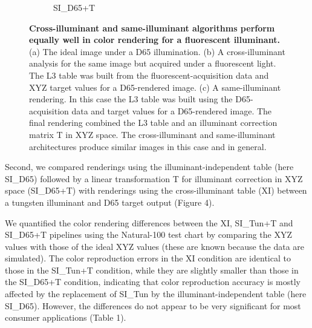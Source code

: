 \documentclass[]{spie}
\begin{document}
\begin{figure}
\begin{center}
\begin{subfigure}[b]{0.3\textwidth}
    \caption{SI\_D65+T}
\end{subfigure}
\end{center}
\caption{\textbf{Cross-illuminant and same-illuminant algorithms perform equally well in color rendering for a fluorescent illuminant.} (a) The ideal image under a D65 illumination. (b) A cross-illuminant analysis for the same image but acquired under a fluorescent light. The L3 table was built from the fluorescent-acquisition data and XYZ target values for a D65-rendered image. (c) A same-illuminant rendering.  In this case the  L3  table was built using the D65-acquisition data and target values for a D65-rendered image.  The final rendering combined the L3  table  and an illuminant correction matrix T in XYZ space. The cross-illuminant and same-illuminant architectures produce similar images in this case and in general.}
\label{fig:filters}
\end{figure}


Second, we compared renderings using the illuminant-independent table (here SI\_D65) followed by a linear transformation T for illuminant correction in XYZ space (SI\_D65+T) with renderings using the cross-illuminant table (XI) between a tungsten illuminant and D65 target output (Figure 4).

We quantified the color rendering differences between the XI, SI\_Tun+T and SI\_D65+T  pipelines using the Natural-100 test chart by comparing the XYZ values with those of the ideal XYZ values (these are known because the data are simulated).  The color reproduction errors in the XI condition are identical to those in the SI\_Tun+T condition, while they are slightly smaller than those in the SI\_D65+T condition, indicating that color reproduction accuracy is mostly affected by the replacement of SI\_Tun by the illuminant-independent table (here SI\_D65).  However, the differences do not appear to be very significant for most consumer applications (Table 1). 
\end{document}
